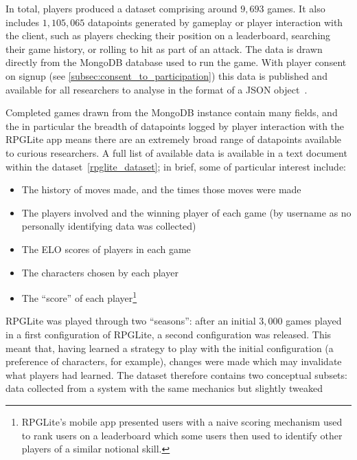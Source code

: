 In total, players produced a dataset comprising around $9,693$
games. It also includes
$1,105,065$ datapoints generated by gameplay or player interaction with the
client, such as players checking their position on a leaderboard, searching
their game history, or rolling to hit as part of an attack. The data is drawn
directly from the MongoDB database used to run the game. With player consent on
signup (see \cref{subsec:consent_to_participation}) this data is published and
available for all researchers to analyse in the format of a JSON object~\cite{rpglite_dataset}.

Completed games drawn from the MongoDB instance contain many fields, and the in
particular the breadth of datapoints logged by player interaction with the
RPGLite app means there are an extremely broad range of datapoints available to
curious researchers. A full list of available data is available in
a text document within the dataset~\cref{rpglite_dataset}; in brief, some of
particular interest include: 

\begin{itemize}
    \item The history of moves made, and the times those moves were
made
\item The players involved and the winning player of each game (by username as
no personally identifying data was collected)
\item The ELO scores of players in each game
\item The characters chosen by each player
\item The ``score'' of each player\footnote{RPGLite's mobile app presented users
with a naive scoring mechanism used to rank users on a leaderboard which some
users then used to identify other players of a similar notional skill.}
\end{itemize}

RPGLite was played through two ``seasons'': after an initial $3,000$ games
played in a first configuration of RPGLite, a second configuration was released.
This meant that, having learned a strategy to play with the initial
configuration (a preference of characters, for example), changes were made which
may invalidate what players had learned. The dataset therefore contains two
conceptual subsets: data collected from a system with the same mechanics but
slightly tweaked
